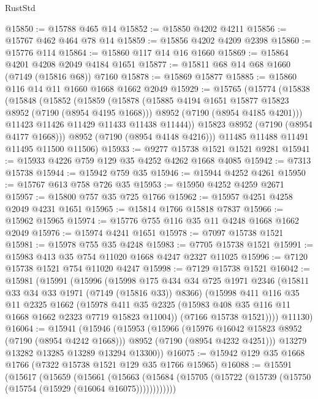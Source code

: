 \begin{lexlean}{RustStd}
\begin{coremodule}
@15850 := @15788 @465 @14
@15852 := @15850 @4202 @4211
@15856 := @15767 @462 @464 @78 @14
@15859 := @15856 @4202 @4209 @2398
@15860 := @15776 @114
@15864 := @15860 @117 @14 @16 @1660
@15869 := @15864 @4201 @4208 @2049 @4184 @1651
@15877 := @15811 @68 @14 @68 @1660 (@7149 (@15816 @68)) @7160
@15878 := @15869 @15877
@15885 := @15860 @116 @14 @11 @1660 @1668 @1662 @2049
@15929 := @15765
    (@15774
      (@15838
        (@15848
          (@15852
            (@15859
              (@15878
                (@15885 @4194 @1651 @15877 @15823 @8952 (@7190 (@8954 @4195 @1668)))
                @8952
                (@7190 (@8954 @4185 @4201)))
              @11423
              @11426
              @11429
              @11433
              @11438
              @11444))
          @15823
          @8952
          (@7190 (@8954 @4177 @1668)))
        @8952
        (@7190 (@8954 @4148 @4216)))
      @11485
      @11488
      @11491
      @11495
      @11500
      @11506)
@15933 := @9277 @15738 @1521 @1521 @9281
@15941 := @15933 @4226 @759 @129 @35 @4252 @4262 @1668 @4085
@15942 := @7313 @15738
@15944 := @15942 @759 @35
@15946 := @15944 @4252 @4261
@15950 := @15767 @613 @758 @726 @35
@15953 := @15950 @4252 @4259 @2671
@15957 := @15800 @757 @35 @725 @1766
@15962 := @15957 @4251 @4258 @2049 @4231 @1651
@15965 := @15814 @1766 @15818 @7837
@15966 := @15962 @15965
@15974 := @15776 @755 @116 @35 @11 @4248 @1668 @1662 @2049
@15976 := @15974 @4241 @1651
@15978 := @7097 @15738 @1521
@15981 := @15978 @755 @35 @4248
@15983 := @7705 @15738 @1521
@15991 := @15983 @413 @35 @754 @11020 @1668 @4247 @2327 @11025
@15996 := @7120 @15738 @1521 @754 @11020 @4247
@15998 := @7129 @15738 @1521
@16042 := @15981
    (@15991
      (@15996
        (@15998
          @175
          @434
          @34
          @725
          @1971
          @2346
          (@15811 @33 @34 @33 @1971 (@7149 (@15816 @33)) @8366)
          (@15998
            @411
            @116
            @35
            @11
            @2325
            @1662
            (@15978 @411 @35 @2325 (@15983 @408 @35 @116 @11 @1668 @1662 @2323 @7719 @15823 @11004))
            (@7166 @15738 @1521))))
      @11130)
@16064 := @15941
    (@15946
      (@15953
        (@15966
          (@15976 @16042 @15823 @8952 (@7190 (@8954 @4242 @1668)))
          @8952
          (@7190 (@8954 @4232 @4251)))
        @13279
        @13282
        @13285
        @13289
        @13294
        @13300))
@16075 := @15942 @129 @35 @1668 @1766 (@7322 @15738 @1521 @129 @35 @1766 @15965)
@16088 := @15591
    (@15617
      (@15659
        (@15661
          (@15663 (@15684 (@15705 (@15722 (@15739 (@15750 (@15754 (@15929 (@16064 @16075))))))))))))

\end{coremodule}
\end{lexlean}
